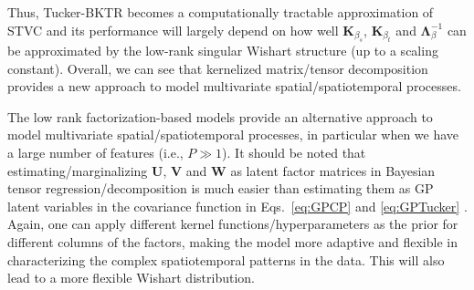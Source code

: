 \documentclass[12pt]{article}
\newcommand{\bd}[1]{\boldsymbol{#1}}
\begin{document}
Thus, Tucker-BKTR becomes a computationally tractable approximation of STVC and its performance will largely depend on how well $\bd{K}_{\beta_s}$, $\bd{K}_{\beta_t}$ and $\bd{\Lambda}_{\beta}^{-1}$ can be approximated by the low-rank singular Wishart structure (up to a scaling constant). Overall, we can see that kernelized matrix/tensor decomposition provides a new approach to model multivariate spatial/spatiotemporal processes. 






The low rank factorization-based models provide an alternative approach to model multivariate spatial/spatiotemporal processes, in particular when we have a large number of features (i.e., $P\gg 1$). It should be noted that  estimating/marginalizing $\boldsymbol{U}$, $\boldsymbol{V}$ and $\boldsymbol{W}$ as latent factor matrices in Bayesian tensor regression/decomposition is much easier than estimating them as GP latent variables in the covariance function in Eqs.~\eqref{eq:GPCP} and \eqref{eq:GPTucker} \citep{lawrence2003gaussian,li2009latent,yu2018tensor}. Again, %
one can apply different kernel functions/hyperparameters as the prior for different columns of the factors, making the model more adaptive and flexible in characterizing the complex spatiotemporal patterns in the data. This will also lead to a more flexible Wishart distribution. 




\end{document}
